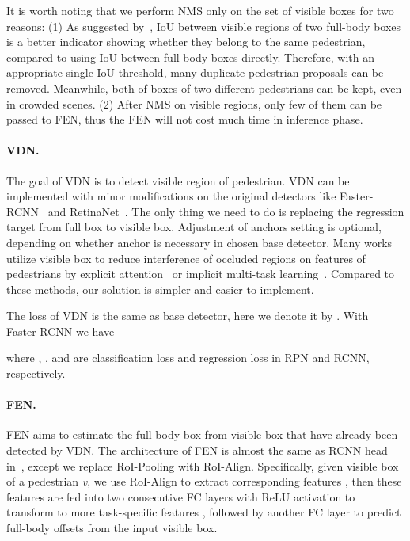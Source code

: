 \documentclass[10pt,twocolumn,letterpaper]{article}
\begin{document}
It is worth noting that we perform NMS only on the set of visible boxes for two reasons: (1) As suggested by~\cite{huang2020R2nms}, IoU between visible regions of two full-body boxes is a better indicator showing whether they belong to the same pedestrian, compared to using IoU between full-body boxes directly. Therefore, with an appropriate single IoU threshold, many duplicate pedestrian proposals can be removed. Meanwhile, both of boxes of two different pedestrians can be kept, even in crowded scenes. (2) After NMS on visible regions, only few of them can be passed to FEN, thus the FEN will not cost much time in inference phase. 

\paragraph{VDN.} The goal of VDN is to detect visible region of pedestrian. VDN can be implemented with minor modifications on the original detectors like Faster-RCNN~\cite{ren2015faster} and RetinaNet~\cite{lin2017focal}. The only thing we need to do is replacing the regression target from full box to visible box. Adjustment of anchors setting is optional, depending on whether anchor is necessary in chosen base detector. Many works utilize visible box to reduce interference of occluded regions on features of pedestrians by explicit attention~\cite{zhang2018occludedattention,pang2019mask} or implicit multi-task learning~\cite{Zhou_2018_bibox}. Compared to these methods, our solution is simpler and easier to implement.

The loss of VDN is the same as base detector, here we denote it by . With Faster-RCNN we have

    where , ,  and  are classification loss and regression loss in RPN and RCNN, respectively.

\paragraph{FEN.} FEN aims to estimate the full body box from visible box that have already been detected by VDN. The architecture of FEN is almost the same as RCNN head in~\cite{ren2015faster}, except we replace RoI-Pooling with RoI-Align. Specifically, given visible box of a pedestrian \textit{v}, we use RoI-Align to extract corresponding features , then these features are fed into two consecutive FC layers with ReLU activation to transform  to more task-specific features , followed by another FC layer to predict full-body offsets from the input visible box.
\end{document}
